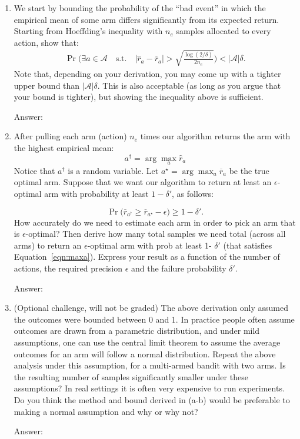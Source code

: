 \documentclass{article}
\newcommand{\answer}[1]{
    \begin{tcolorbox}[breakable]
    Answer: #1
    \end{tcolorbox}
    \clearpage
}
\begin{document}
\begin{enumerate}
    \item[(a)] We start by bounding the probability of the ``bad event'' in which the empirical mean of some arm differs significantly from its expected return. Starting from Hoeffding's inequality with $n_e$ samples allocated to every action, show that:
    \begin{align}
    \Pr\Bigg(\exists a \in \mathcal{A} \quad \text{s.t.} \quad |\widehat r_a - \overline r_a | > \sqrt{\frac{\log(2/\delta)}{2n_e}}	\Bigg) < |\mathcal{A}|\delta.
    \end{align}
    Note that, depending on your derivation, you may come up with a tighter upper bound than $|\mathcal{A}|\delta$. This is also acceptable (as long as you argue that your bound is tighter), but showing the inequality above is sufficient.
    \answer{

    }

    \item[(b)] After pulling each arm (action) $n_e$ times our algorithm returns the arm with the highest empirical mean:
    \begin{equation}
    a^\dagger = \arg\max_{a} \widehat r_a	
    \end{equation}
    Notice that $a^\dagger$ is a random variable.
    Let ${a^\star} = \arg\max_a \overline r_{a}$ be the true optimal arm. Suppose that we want our algorithm to return at least an $\epsilon$-optimal arm with probability at least $1-\delta'$, as follows:

    \begin{equation}
    \label{eqn:maxa}
    \Pr \Bigg(\overline r_{a^\dagger} \geq  \overline r_{a^\star} - \epsilon \Bigg) \geq 1-\delta'.
    \end{equation}
    How accurately do we need to estimate each arm in order to pick an arm that is $\epsilon$-optimal? Then derive how many total samples we need total (across all arms) to return an $\epsilon$-optimal arm with prob at least 1- $\delta'$ (that satisfies Equation~\ref{eqn:maxa}).  Express your result as a function of the number of actions, the required precision $\epsilon$ and the failure probability $\delta'$.
    \answer{

    }

    \item[(c)] (Optional challenge, will not be graded) The above derivation only assumed the outcomes were bounded between 0 and 1. In practice people often assume outcomes are drawn from a parametric distribution, and under mild assumptions, one can use the central limit theorem to assume the average outcomes for an arm will follow a normal distribution. Repeat the above analysis under this assumption, for a multi-armed bandit with two arms. Is the resulting number of samples significantly smaller under these assumptions? In real settings it is often very expensive to run experiments. Do you think the method and bound derived in (a-b) would be preferable to making a normal assumption and why or why not? 
    \answer{

}
\end{enumerate}
\end{document}
